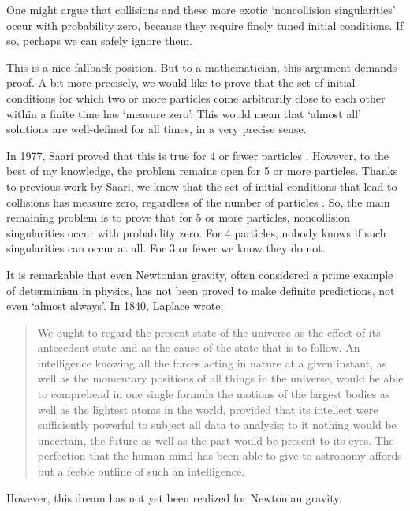 \documentclass[12pt]{article}
\begin{document}
One might argue that collisions and these more exotic `noncollision singularities' occur with probability zero, because they require finely tuned initial conditions.  If so, perhaps we can safely ignore them.  

This is a nice fallback position.  But to a mathematician, this argument demands proof.   A bit more precisely, we would like to prove that the set of initial conditions for which two or more particles come arbitrarily close to each other within a finite time has `measure zero'.  This would mean that `almost all' solutions are well-defined for all times, in a very precise sense.

In 1977, Saari proved that this is true for 4 or fewer particles \cite{Saari}.  However, to the best of my knowledge, the problem remains open for 5 or more particles.  Thanks to previous work by Saari, we know that the set of initial conditions that lead to collisions has measure zero, regardless of the number of particles \cite{Saari_collision_1,Saari_collision_2}.  So, the main remaining problem is to prove that for 5 or more particles, noncollision singularities occur with probability zero.  For 4 particles, nobody knows if such singularities can occur at all.  For 3 or fewer we know they do not.

It is remarkable that even Newtonian gravity, often considered a prime example of determinism in physics, has not been proved to make definite predictions, not even `almost always'.   In 1840, Laplace \cite{Laplace} wrote:

\begin{quote}
We ought to regard the present state of the universe as the effect of its antecedent state and as the cause of the state that is to follow. An intelligence knowing all the forces acting in nature at a given instant, as well as the momentary positions of all things in the universe, would be able to comprehend in one single formula the motions of the largest bodies as well as the lightest atoms in the world, provided that its intellect were sufficiently powerful to subject all data to analysis; to it nothing would be uncertain, the future as well as the past would be present to its eyes. The perfection that the human mind has been able to give to astronomy affords but a feeble outline of such an intelligence.
\end{quote}

\noindent However, this dream has not yet been realized for Newtonian gravity.  
\end{document}
